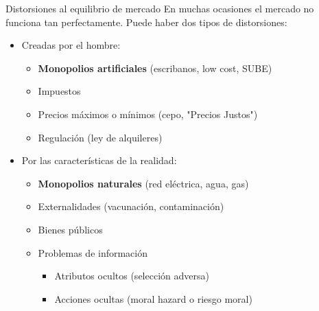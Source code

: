 \documentclass{beamer}
\begin{document}
\begin{frame}{Distorsiones al equilibrio de mercado}
    En muchas ocasiones el mercado no funciona tan perfectamente. Puede haber dos tipos de distorsiones: \vspace{1mm}
    \begin{itemize}
        \item Creadas por el hombre:
        \begin{itemize}
            \item \textbf{Monopolios artificiales} (escribanos, low cost, SUBE)
             \vspace{1mm}
             \item Impuestos
             \vspace{1mm}
            \item Precios máximos o mínimos (cepo, "Precios Justos")
             \vspace{1mm}
            \item Regulación (ley de alquileres)
        \end{itemize}
        \vspace{1mm}
        \item Por las características de la realidad:
        \begin{itemize}
            \item \textbf{Monopolios naturales} (red eléctrica, agua, gas)   
             \vspace{1mm}
            \item Externalidades (vacunación, contaminación)
             \vspace{1mm}
            \item Bienes públicos
            \vspace{1mm}
            \item Problemas de información
            \begin{itemize}
                \item Atributos ocultos (selección adversa)
                 \vspace{1mm}
                \item Acciones ocultas (moral hazard o riesgo moral)
            \end{itemize}        
        \end{itemize}
    \end{itemize}
\end{frame}
\end{document}
